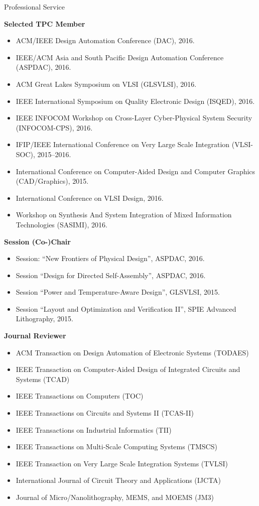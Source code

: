 
\begin{rSection}{Professional Service}

\textbf{Selected TPC Member}
\begin{itemize}
    \item ACM/IEEE Design Automation Conference (DAC), 2016.
    \item IEEE/ACM Asia and South Pacific Design Automation Conference (ASPDAC), 2016.
    \item ACM Great Lakes Symposium on VLSI (GLSVLSI), 2016.
    \item IEEE International Symposium on Quality Electronic Design (ISQED), 2016.
    \item IEEE INFOCOM Workshop on Cross-Layer Cyber-Physical System Security (INFOCOM-CPS), 2016.
    \item IFIP/IEEE International Conference on Very Large Scale Integration (VLSI-SOC), 2015--2016.
    \item International Conference on Computer-Aided Design and Computer Graphics (CAD/Graphics), 2015.
    \item International Conference on VLSI Design, 2016.
    \item Workshop on Synthesis And System Integration of Mixed Information Technologies (SASIMI), 2016.
\end{itemize}

\textbf{Session (Co-)Chair}
\begin{itemize}
    \item Session: ``New Frontiers of Physical Design'', ASPDAC, 2016.
    \item Session ``Design for Directed Self-Assembly'', ASPDAC, 2016.
    \item Session ``Power and Temperature-Aware Design'', GLSVLSI, 2015.
    \item Session ``Layout and Optimization and Verification II'', SPIE Advanced Lithography, 2015.
\end{itemize}

\textbf{Journal Reviewer}
\begin{itemize}
    \item ACM Transaction on Design Automation of Electronic Systems (TODAES)
    \item IEEE Transaction on Computer-Aided Design of Integrated Circuits and Systems (TCAD)
    \item IEEE Transactions on Computers (TOC)
    \item IEEE Transactions on Circuits and Systems II (TCAS-II)
    \item IEEE Transactions on Industrial Informatics (TII)
    \item IEEE Transactions on Multi-Scale Computing Systems (TMSCS)
    \item IEEE Transaction on Very Large Scale Integration Systems (TVLSI)
    \item International Journal of Circuit Theory and Applications (IJCTA)
    \item Journal of Micro/Nanolithography, MEMS, and MOEMS (JM3)
\end{itemize}


\end{rSection}
